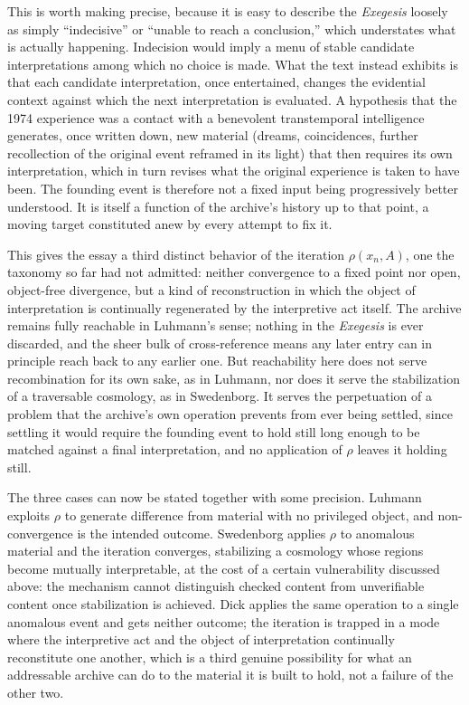 \documentclass[11pt]{article}
\begin{document}
This is worth making precise, because it is easy to describe the \emph{Exegesis} loosely as simply ``indecisive'' or ``unable to reach a conclusion,'' which understates what is actually happening. Indecision would imply a menu of stable candidate interpretations among which no choice is made. What the text instead exhibits is that each candidate interpretation, once entertained, changes the evidential context against which the next interpretation is evaluated. A hypothesis that the 1974 experience was a contact with a benevolent transtemporal intelligence generates, once written down, new material (dreams, coincidences, further recollection of the original event reframed in its light) that then requires its own interpretation, which in turn revises what the original experience is taken to have been. The founding event is therefore not a fixed input being progressively better understood. It is itself a function of the archive's history up to that point, a moving target constituted anew by every attempt to fix it.

This gives the essay a third distinct behavior of the iteration $\rho(x_n, A)$, one the taxonomy so far had not admitted: neither convergence to a fixed point nor open, object-free divergence, but a kind of reconstruction in which the object of interpretation is continually regenerated by the interpretive act itself. The archive remains fully reachable in Luhmann's sense; nothing in the \emph{Exegesis} is ever discarded, and the sheer bulk of cross-reference means any later entry can in principle reach back to any earlier one. But reachability here does not serve recombination for its own sake, as in Luhmann, nor does it serve the stabilization of a traversable cosmology, as in Swedenborg. It serves the perpetuation of a problem that the archive's own operation prevents from ever being settled, since settling it would require the founding event to hold still long enough to be matched against a final interpretation, and no application of $\rho$ leaves it holding still.

The three cases can now be stated together with some precision. Luhmann exploits $\rho$ to generate difference from material with no privileged object, and non-convergence is the intended outcome. Swedenborg applies $\rho$ to anomalous material and the iteration converges, stabilizing a cosmology whose regions become mutually interpretable, at the cost of a certain vulnerability discussed above: the mechanism cannot distinguish checked content from unverifiable content once stabilization is achieved. Dick applies the same operation to a single anomalous event and gets neither outcome; the iteration is trapped in a mode where the interpretive act and the object of interpretation continually reconstitute one another, which is a third genuine possibility for what an addressable archive can do to the material it is built to hold, not a failure of the other two.
\end{document}
